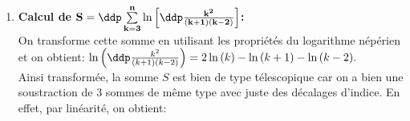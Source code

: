 \begin{correction}
\begin{enumerate}
\item \textbf{Calcul de $\mathbf{S=\ddp \sum\limits_{k=3}^{n} \ln{\left\lbrack  \ddp\frac{k^2}{(k+1)(k-2)} \right\rbrack}}$:}\\ 
On transforme cette somme en utilisant les propri\'et\'es du logarithme n\'ep\'erien et on obtient: $\ln{\left(  \ddp\frac{k^2}{(k+1)(k-2)}\right)}=2\ln{(k)}-\ln{(k+1)}-\ln{(k-2)}.$\\
Ainsi transform\'ee, la somme $S$ est bien de type t\'elescopique car on a bien une soustraction de 3 sommes de m\^{e}me type avec juste des d\'ecalages d'indice. En effet, par lin\'earit\'e, on obtient:

\end{enumerate}
\end{correction}
